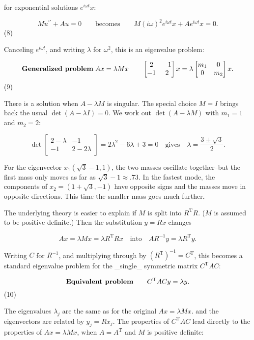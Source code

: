 for exponential solutions \(e^{i\omega t}x\):

\[Mu^{\prime\prime}+Au=0\qquad\text{becomes}\qquad M(i\omega)^{2}e^{i\omega t}x+Ae^ {i\omega t}x=0.\] (8)

Canceling \(e^{i\omega t}\), and writing \(\lambda\) for \(\omega^{2}\), this is an eigenvalue problem:

\[\text{\bf Generalized problem}\;Ax=\lambda Mx\qquad\begin{bmatrix}2&-1\\ -1&2\end{bmatrix}x=\lambda\begin{bmatrix}m_{1}&0\\ 0&m_{2}\end{bmatrix}x.\] (9)

There is a solution when \(A-\lambda M\) is singular. The special choice \(M=I\) brings back the usual \(\det(A-\lambda I)=0\). We work out \(\det(A-\lambda M)\) with \(m_{1}=1\) and \(m_{2}=2\):

\[\det\begin{bmatrix}2-\lambda&-1\\ -1&2-2\lambda\end{bmatrix}=2\lambda^{2}-6\lambda+3=0\quad\text{gives}\quad \lambda=\frac{3\pm\sqrt{3}}{2}.\]

For the eigenvector \(x_{1}(\sqrt{3}-1,1)\), the two masses oscillate together--but the first mass only moves as far as \(\sqrt{3}-1\approx.73\). In the fastest mode, the components of \(x_{2}=(1+\sqrt{3},-1)\) have opposite signs and the masses move in opposite directions. This time the smaller mass goes much further.

The underlying theory is easier to explain if \(M\) is split into \(R^{\mathrm{T}}R\). (\(M\) is assumed to be positive definite.) Then the substitution \(y=Rx\) changes

\[Ax=\lambda Mx=\lambda R^{\mathrm{T}}Rx\quad\text{into}\quad AR^{-1}y=\lambda R ^{\mathrm{T}}y.\]

Writing \(C\) for \(R^{-1}\), and multiplying through by \((R^{\mathrm{T}})^{-1}=C^{\mathrm{T}}\), this becomes a standard eigenvalue problem for the _single_ symmetric matrix \(C^{\mathrm{T}}AC\):

\[\text{\bf Equivalent problem}\qquad C^{\mathrm{T}}ACy=\lambda y.\] (10)

The eigenvalues \(\lambda_{j}\) are the same as for the original \(Ax=\lambda Mx\). and the eigenvectors are related by \(y_{j}=Rx_{j}\). The properties of \(C^{\mathrm{T}}AC\) lead directly to thc properties of \(Ax=\lambda Mx\), when \(A=A^{\mathrm{T}}\) and \(M\) is positive definite:

